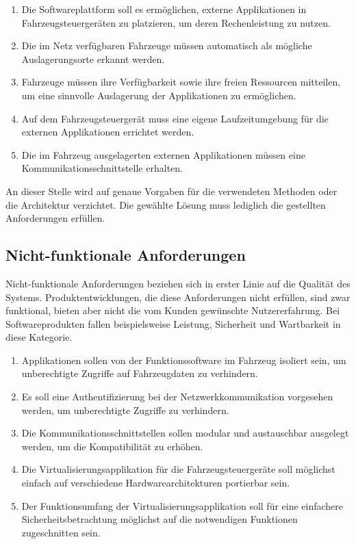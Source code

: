 \begin{enumerate}
    \item Die Softwareplattform soll es ermöglichen, externe Applikationen in Fahrzeugsteuergeräten zu platzieren, um deren Rechenleistung zu nutzen.
    \item Die im Netz verfügbaren Fahrzeuge müssen automatisch als mögliche Auslagerungsorte erkannt werden.
    \item Fahrzeuge müssen ihre Verfügbarkeit sowie ihre freien Ressourcen mitteilen, um eine sinnvolle Auslagerung der Applikationen zu ermöglichen.
    \item Auf dem Fahrzeugsteuergerät muss eine eigene Laufzeitumgebung für die externen Applikationen errichtet werden.
    \item Die im Fahrzeug ausgelagerten externen Applikationen müssen eine Kommunikationsschnittstelle erhalten.
\end{enumerate}

An dieser Stelle wird auf genaue Vorgaben für die verwendeten Methoden oder die Architektur verzichtet. Die gewählte Lösung muss lediglich die gestellten Anforderungen erfüllen.

\subsection{Nicht-funktionale Anforderungen}

Nicht-funktionale Anforderungen beziehen sich in erster Linie auf die Qualität des Systems. Produktentwicklungen, die diese Anforderungen nicht erfüllen, sind zwar funktional, bieten aber nicht die vom Kunden gewünschte Nutzererfahrung. Bei Softwareprodukten fallen beispielsweise Leistung, Sicherheit und Wartbarkeit in diese Kategorie.

\begin{enumerate}
    \item Applikationen sollen von der Funktionssoftware im Fahrzeug isoliert sein, um unberechtigte Zugriffe auf Fahrzeugdaten zu verhindern.
    \item Es soll eine Authentifizierung bei der Netzwerkkommunikation vorgesehen werden, um unberechtigte Zugriffe zu verhindern.
    \item Die Kommunikationsschnittstellen sollen modular und austauschbar ausgelegt werden, um die Kompatibilität zu erhöhen.
    \item Die Virtualisierungsapplikation für die Fahrzeugsteuergeräte soll möglichst einfach auf verschiedene Hardwarearchitekturen portierbar sein.
    \item Der Funktionsumfang der Virtualisierungsapplikation soll für eine einfachere Sicherheitsbetrachtung möglichst auf die notwendigen Funktionen zugeschnitten sein.
\end{enumerate}


